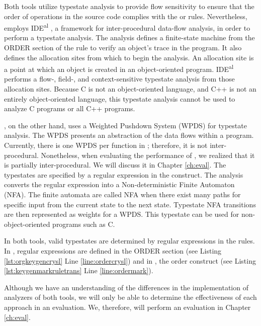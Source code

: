 Both tools utilize typestate analysis to provide flow sensitivity to ensure that the order of operations in the source code complies with the \MARK{} or \crysl{} rules. Nevertheless, \cognicryptsast{} employs IDE\textsuperscript{al} \cite{IDEal}, a framework for inter-procedural data-flow analysis, in order to perform a typestate analysis. The analysis defines a finite-state machine from the ORDER section of the \crysl{} rule to verify an object's trace in the program. It also defines the allocation sites from which to begin the analysis. An allocation site is a point at which an object is created in an object-oriented program. IDE\textsuperscript{al} performs a flow-, field-, and context-sensitive typestate analysis from those allocation sites. Because C is not an object-oriented language, and C++ is not an entirely object-oriented language, this typestate analysis cannot be used to analyze C programs or all C++ programs.

\codyze, on the other hand, uses a Weighted Pushdown System (WPDS) \cite{pushdown} for typestate analysis. The WPDS presents an abstraction of the data flows within a program. Currently, there is one WPDS per function in \codyze; therefore, it is not inter-procedural. Nonetheless, when evaluating the performance of \codyze, we realized that it is partially inter-procedural. We will discuss it in Chapter \ref {ch:eval}. The typestates are specified by a regular expression in the \MARK{}  construct. The analysis converts the regular expression into a Non-deterministic Finite Automaton (NFA). The finite automata are called NFA when there exist many paths for specific input from the current state to the next state. Typestate NFA transitions are then represented as weights for a WPDS. This typestate can be used for non-object-oriented programs such as C.

In both tools, valid typestates are determined by regular expressions in the rules. In \crysl, regular expressions are defined in the ORDER section (see Listing \ref{lst:orgkeygencrysl} Line \ref{line:ordercrysl}) and in \MARK, the order construct (see Listing \ref{lst:keygenmarkruletrans} Line \ref{line:ordermark}).

Although we have an understanding of the differences in the implementation of analyzers of both tools, we will only be able to determine the effectiveness of each approach in an evaluation. We, therefore, will perform an evaluation in Chapter \ref{ch:eval}.

